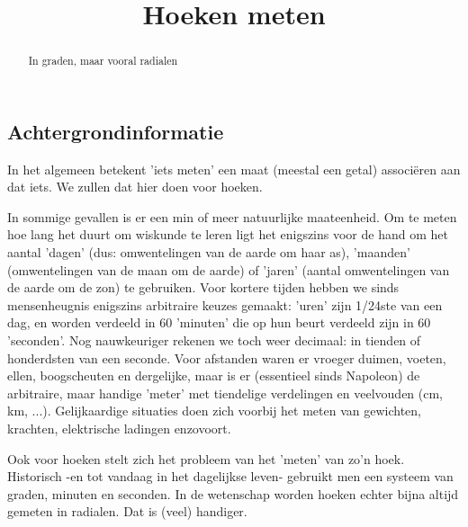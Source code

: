 \documentclass{ximera}
\title[Goniometrie:]{Hoeken meten}
\begin{document}
\begin{abstract}
In graden, maar vooral radialen	
\end{abstract}
\maketitle


\subsection{Achtergrondinformatie}
	In het algemeen betekent 'iets meten' een maat (meestal een getal) associëren aan dat iets. We zullen dat hier doen voor hoeken.
\begin{expandable}
	In sommige gevallen is er een min of meer natuurlijke maateenheid. Om te meten hoe lang het duurt om wiskunde te leren ligt het enigszins voor de hand om het aantal 'dagen' (dus: omwentelingen van de aarde om haar as), 'maanden' (omwentelingen van de maan om de aarde) of 'jaren' (aantal omwentelingen van de aarde om de zon) te gebruiken. Voor kortere tijden hebben we sinds mensenheugnis enigszins arbitraire keuzes gemaakt: 'uren' zijn 1/24ste van een dag, en worden verdeeld in 60 'minuten' die op hun beurt verdeeld zijn in 60 'seconden'. Nog nauwkeuriger rekenen we toch weer decimaal: in tienden of honderdsten van een seconde. Voor afstanden waren er vroeger duimen, voeten, ellen, boogscheuten en dergelijke, maar is er (essentieel sinds Napoleon) de arbitraire, maar handige 'meter' met tiendelige verdelingen en veelvouden (cm, km, ...). Gelijkaardige situaties doen zich voorbij het meten van gewichten, krachten, elektrische ladingen enzovoort.

	Ook voor hoeken stelt zich het probleem van het 'meten' van zo'n hoek. Historisch -en tot vandaag in het dagelijkse leven- gebruikt men een systeem van graden, minuten en seconden. In de wetenschap worden hoeken echter bijna altijd gemeten in radialen. Dat is (veel) handiger.
\end{expandable}
\end{document}
